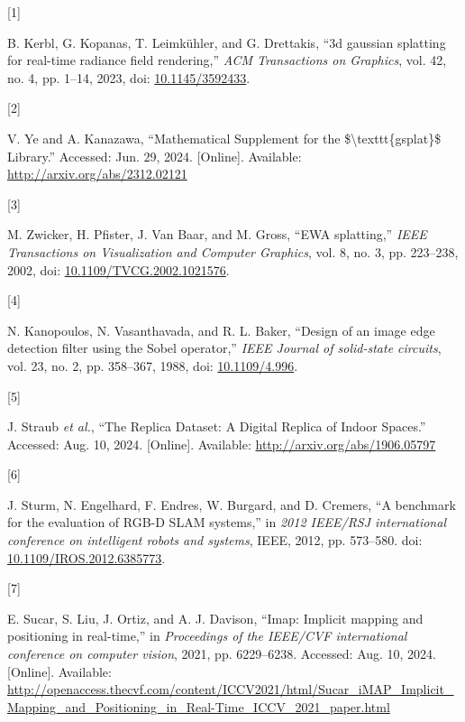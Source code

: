 \documentclass[twocolumn]{article} %
\newlength{\cslhangindent}
\newlength{\csllabelwidth}
\newenvironment{CSLReferences}[2] %
{\begin{list}{}{%
  \setlength{\itemindent}{0pt}
  \setlength{\leftmargin}{0pt}
  \setlength{\parsep}{0pt}
  \ifodd #1
  \setlength{\leftmargin}{\cslhangindent}
  \setlength{\itemindent}{-1\cslhangindent}
  \fi
  \setlength{\itemsep}{#2\baselineskip}}}
{\end{list}}
\newcommand{\CSLLeftMargin}[1]{\parbox[t]{\csllabelwidth}{\strut#1\strut}}
\newcommand{\CSLRightInline}[1]{\parbox[t]{\linewidth - \csllabelwidth}{\strut#1\strut}}
\begin{document}
\label{refs}
\begin{CSLReferences}{0}{0}
\CSLLeftMargin{{[}1{]} }%
\CSLRightInline{B. Kerbl, G. Kopanas, T. Leimkühler, and G. Drettakis,
{``3d gaussian splatting for real-time radiance field rendering,''}
\emph{ACM Transactions on Graphics}, vol. 42, no. 4, pp. 1--14, 2023,
doi: \href{https://doi.org/10.1145/3592433}{10.1145/3592433}.}

\CSLLeftMargin{{[}2{]} }%
\CSLRightInline{V. Ye and A. Kanazawa, {``Mathematical {Supplement} for
the \$\textbackslash texttt\{gsplat\}\$ {Library}.''} Accessed: Jun. 29,
2024. {[}Online{]}. Available: \url{http://arxiv.org/abs/2312.02121}}

\CSLLeftMargin{{[}3{]} }%
\CSLRightInline{M. Zwicker, H. Pfister, J. Van Baar, and M. Gross,
{``{EWA} splatting,''} \emph{IEEE Transactions on Visualization and
Computer Graphics}, vol. 8, no. 3, pp. 223--238, 2002, doi:
\href{https://doi.org/10.1109/TVCG.2002.1021576}{10.1109/TVCG.2002.1021576}.}

\CSLLeftMargin{{[}4{]} }%
\CSLRightInline{N. Kanopoulos, N. Vasanthavada, and R. L. Baker,
{``Design of an image edge detection filter using the {Sobel}
operator,''} \emph{IEEE Journal of solid-state circuits}, vol. 23, no.
2, pp. 358--367, 1988, doi:
\href{https://doi.org/10.1109/4.996}{10.1109/4.996}.}

\CSLLeftMargin{{[}5{]} }%
\CSLRightInline{J. Straub \emph{et al.}, {``The {Replica Dataset}: {A
Digital Replica} of {Indoor Spaces}.''} Accessed: Aug. 10, 2024.
{[}Online{]}. Available: \url{http://arxiv.org/abs/1906.05797}}

\CSLLeftMargin{{[}6{]} }%
\CSLRightInline{J. Sturm, N. Engelhard, F. Endres, W. Burgard, and D.
Cremers, {``A benchmark for the evaluation of {RGB-D SLAM} systems,''}
in \emph{2012 {IEEE}/{RSJ} international conference on intelligent
robots and systems}, IEEE, 2012, pp. 573--580. doi:
\href{https://doi.org/10.1109/IROS.2012.6385773}{10.1109/IROS.2012.6385773}.}

\CSLLeftMargin{{[}7{]} }%
\CSLRightInline{E. Sucar, S. Liu, J. Ortiz, and A. J. Davison, {``Imap:
{Implicit} mapping and positioning in real-time,''} in \emph{Proceedings
of the {IEEE}/{CVF} international conference on computer vision}, 2021,
pp. 6229--6238. Accessed: Aug. 10, 2024. {[}Online{]}. Available:
\url{http://openaccess.thecvf.com/content/ICCV2021/html/Sucar_iMAP_Implicit_Mapping_and_Positioning_in_Real-Time_ICCV_2021_paper.html}}


\end{CSLReferences}
\end{document}
